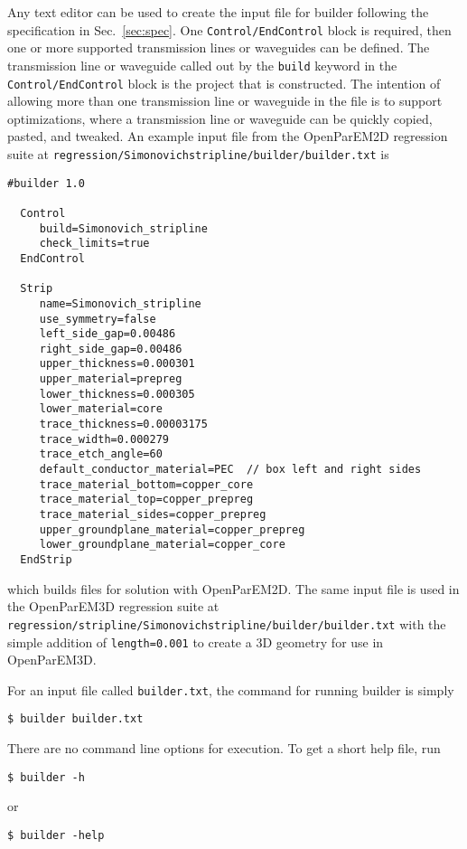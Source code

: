 \documentclass[titlepage]{article}
\renewcommand\_{\textunderscore\linebreak[1]}
\begin{document}
Any text editor can be used to create the input file for builder following the specification in Sec.~\ref{sec:spec}. One \texttt{Control/EndControl} block is required, then one or more supported transmission lines or waveguides can be defined.  The transmission line or waveguide called out by the \texttt{build} keyword in the \texttt{Control/EndControl} block is the project that is constructed.  The intention of allowing more than one transmission line or waveguide in the file is to support optimizations, where a transmission line or waveguide can be quickly copied, pasted, and tweaked.
An example input file from the OpenParEM2D regression suite at \newline\texttt{regression/Simonovich\_stripline/builder/builder.txt} is
\begin{Verbatim}[fontsize=\small]
  #builder 1.0

  Control
     build=Simonovich_stripline
     check_limits=true
  EndControl

  Strip
     name=Simonovich_stripline
     use_symmetry=false
     left_side_gap=0.00486
     right_side_gap=0.00486
     upper_thickness=0.000301
     upper_material=prepreg
     lower_thickness=0.000305
     lower_material=core
     trace_thickness=0.00003175
     trace_width=0.000279
     trace_etch_angle=60
     default_conductor_material=PEC  // box left and right sides
     trace_material_bottom=copper_core
     trace_material_top=copper_prepreg
     trace_material_sides=copper_prepreg
     upper_groundplane_material=copper_prepreg
     lower_groundplane_material=copper_core
  EndStrip
\end{Verbatim}
which builds files for solution with OpenParEM2D.  The same input file is used in the OpenParEM3D regression suite at \texttt{regression/stripline/Simonovich\_stripline/builder/builder.txt} with the simple addition of \texttt{length=0.001} to create a 3D geometry for use in OpenParEM3D.

For an input file called \texttt{builder.txt}, the command for running builder is simply
\begin{Verbatim}[fontsize=\small]
  $ builder builder.txt
\end{Verbatim}
There are no command line options for execution.  To get a short help file, run
\begin{Verbatim}[fontsize=\small]
  $ builder -h
\end{Verbatim}
or
\begin{Verbatim}[fontsize=\small]
  $ builder -help
\end{Verbatim}
\end{document}
